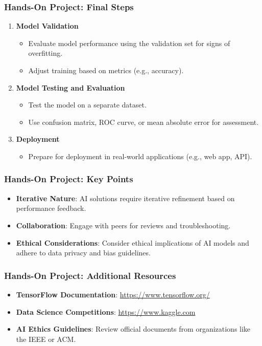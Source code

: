 \documentclass[aspectratio=169]{beamer}
\begin{document}
\begin{frame}[fragile]
    \frametitle{Hands-On Project: Final Steps}
    \begin{enumerate}[resume]
        \item \textbf{Model Validation}
            \begin{itemize}
                \item Evaluate model performance using the validation set for signs of overfitting.
                \item Adjust training based on metrics (e.g., accuracy).
            \end{itemize}
        \item \textbf{Model Testing and Evaluation}
            \begin{itemize}
                \item Test the model on a separate dataset.
                \item Use confusion matrix, ROC curve, or mean absolute error for assessment.
            \end{itemize}
        \item \textbf{Deployment}
            \begin{itemize}
                \item Prepare for deployment in real-world applications (e.g., web app, API).
            \end{itemize}
    \end{enumerate}
\end{frame}

\begin{frame}[fragile]
    \frametitle{Hands-On Project: Key Points}
    \begin{itemize}
        \item \textbf{Iterative Nature}: AI solutions require iterative refinement based on performance feedback.
        \item \textbf{Collaboration}: Engage with peers for reviews and troubleshooting.
        \item \textbf{Ethical Considerations}: Consider ethical implications of AI models and adhere to data privacy and bias guidelines.
    \end{itemize}
\end{frame}

\begin{frame}[fragile]
    \frametitle{Hands-On Project: Additional Resources}
    \begin{itemize}
        \item \textbf{TensorFlow Documentation}: \url{https://www.tensorflow.org/}
        \item \textbf{Data Science Competitions}: \url{https://www.kaggle.com}
        \item \textbf{AI Ethics Guidelines}: Review official documents from organizations like the IEEE or ACM.
    \end{itemize}
\end{frame}
\end{document}
